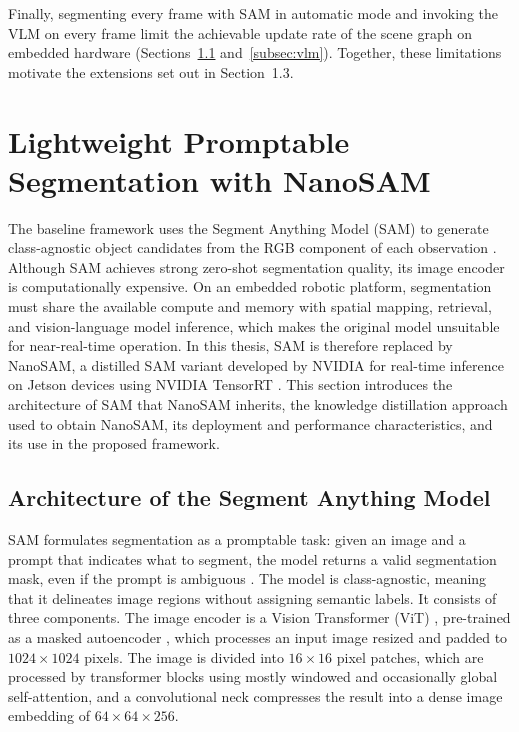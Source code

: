 {{{\small Finally, segmenting every frame with SAM in automatic mode and invoking the VLM on every frame limit the achievable update rate of the scene graph on embedded hardware (Sections~\ref{subsec:sam_architecture} and~\ref{subsec:vlm}). Together, these limitations motivate the extensions set out in Section~1.3.\par}









\section{Lightweight Promptable Segmentation with NanoSAM}
\label{sec:nanosam}
{\small

The baseline framework uses the Segment Anything Model (SAM) to generate class-agnostic object candidates from the RGB component of each observation \cite{kirillov2023segmentanything, previous_rsg_thesis}. Although SAM achieves strong zero-shot segmentation quality, its image encoder is computationally expensive. On an embedded robotic platform, segmentation must share the available compute and memory with spatial mapping, retrieval, and vision-language model inference, which makes the original model unsuitable for near-real-time operation. In this thesis, SAM is therefore replaced by NanoSAM, a distilled SAM variant developed by NVIDIA for real-time inference on Jetson devices using NVIDIA TensorRT \cite{nanosam2023, nvidia_tensorrt}. This section introduces the architecture of SAM that NanoSAM inherits, the knowledge distillation approach used to obtain NanoSAM, its deployment and performance characteristics, and its use in the proposed framework.

}
\subsection{Architecture of the Segment Anything Model}
\label{subsec:sam_architecture}
{\small
SAM formulates segmentation as a promptable task: given an image and a prompt that indicates what to segment, the model returns a valid segmentation mask, even if the prompt is ambiguous \cite{kirillov2023segmentanything}. The model is class-agnostic, meaning that it delineates image regions without assigning semantic labels. It consists of three components. The image encoder is a Vision Transformer (ViT) \cite{dosovitskiy2021vit}, pre-trained as a masked autoencoder \cite{he2022mae}, which processes an input image resized and padded to $1024 \times 1024$ pixels. The image is divided into $16 \times 16$ pixel patches, which are processed by transformer blocks using mostly windowed and occasionally global self-attention, and a convolutional neck compresses the result into a dense image embedding of $64 \times 64 \times 256$.

}}}
